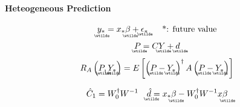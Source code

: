 \documentclass{article}
\begin{document}
\bigskip 

\paragraph{Heteogeneous Prediction}

\begin{equation*}
\underaccent{\wtilde}{y}%
_{\ast }=x_{\ast }%
\underaccent{\wtilde}{\beta}%
+%
\underaccent{\wtilde}{\epsilon}%
_{\ast }\quad \text{*: future value}
\end{equation*}%
\begin{equation*}
\underaccent{\wtilde}{P}%
=C%
\underaccent{\wtilde}{Y}%
+%
\underaccent{\wtilde}{d}%
\end{equation*}%
\begin{equation*}
R_{A}\left( 
\underaccent{\wtilde}{P}%
,%
\underaccent{\wtilde}{Y}%
_{\ast }\right) =E\left[ \left( 
\underaccent{\wtilde}{P}%
-%
\underaccent{\wtilde}{Y}%
_{\ast }\right) ^{\dagger }A\left( 
\underaccent{\wtilde}{P}%
-%
\underaccent{\wtilde}{Y}%
_{\ast }\right) \right] 
\end{equation*}

\begin{equation*}
\hat{C}_{1}=W_{0}^{\dagger }W^{-1}\quad 
\underaccent{\wtilde}{\hat{d}}%
=x_{\ast }%
\underaccent{\wtilde}{\beta}%
-W_{0}^{\dagger }W^{-1}x%
\underaccent{\wtilde}{\beta}%
\end{equation*}
\end{document}
